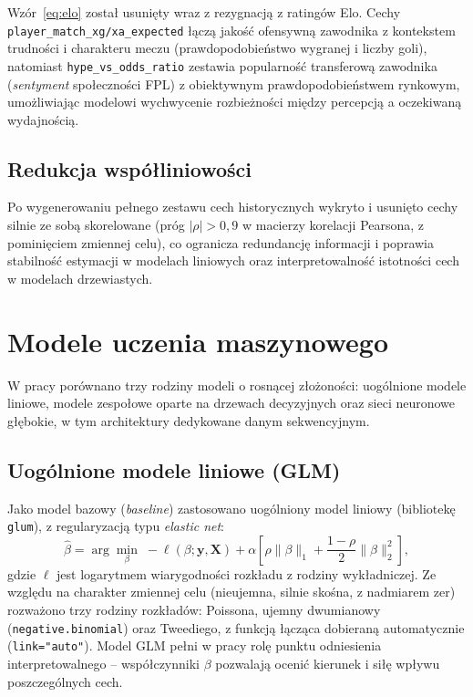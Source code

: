 \documentclass[a4paper,twoside,11pt]{mwrep}
\theoremstyle{plain} \newtheorem{thm}{Twierdzenie}
\theoremstyle{plain} \newtheorem{lem}{Lemat}
\theoremstyle{definition} \newtheorem{defn}{Definicja}
\theoremstyle{remark} \newtheorem*{rem}{Wniosek}
\begin{document}
Wzór~\eqref{eq:elo} został usunięty wraz z rezygnacją z ratingów Elo. Cechy
\texttt{player\_match\_xg/xa\_expected} łączą jakość ofensywną zawodnika z
kontekstem trudności i charakteru meczu (prawdopodobieństwo wygranej i
liczby goli), natomiast \texttt{hype\_vs\_odds\_ratio} zestawia
popularność transferową zawodnika (\emph{sentyment} społeczności FPL) z
obiektywnym prawdopodobieństwem rynkowym, umożliwiając modelowi wychwycenie
rozbieżności między percepcją a oczekiwaną wydajnością.

\section{Redukcja współliniowości}

Po wygenerowaniu pełnego zestawu cech historycznych wykryto i usunięto
cechy silnie ze sobą skorelowane (próg $|\rho| > 0{,}9$ w macierzy korelacji
Pearsona, z pominięciem zmiennej celu), co ogranicza redundancję informacji
i poprawia stabilność estymacji w modelach liniowych oraz interpretowalność
istotności cech w modelach drzewiastych.

\chapter{Modele uczenia maszynowego}\label{ch:models}

W pracy porównano trzy rodziny modeli o rosnącej złożoności: uogólnione
modele liniowe, modele zespołowe oparte na drzewach decyzyjnych oraz sieci
neuronowe głębokie, w tym architektury dedykowane danym sekwencyjnym.

\section{Uogólnione modele liniowe (GLM)}

Jako model bazowy (\emph{baseline}) zastosowano uogólniony model liniowy
(bibliotekę \texttt{glum}), z regularyzacją typu \emph{elastic net}:
\begin{equation}
    \hat{\beta} = \arg\min_{\beta} \; -\ell(\beta; \mathbf{y}, \mathbf{X}) + \alpha \left[ \rho \|\beta\|_1 + \frac{1-\rho}{2}\|\beta\|_2^2 \right],
\end{equation}
gdzie $\ell$ jest logarytmem wiarygodności rozkładu z rodziny
wykładniczej. Ze względu na charakter zmiennej celu (nieujemna, silnie
skośna, z nadmiarem zer) rozważono trzy rodziny rozkładów: Poissona,
ujemny dwumianowy (\texttt{negative.binomial}) oraz Tweediego, z funkcją
łącząca dobieraną automatycznie (\texttt{link="auto"}). Model GLM pełni w
pracy rolę punktu odniesienia interpretowalnego -- współczynniki $\beta$
pozwalają ocenić kierunek i siłę wpływu poszczególnych cech.
\end{document}
